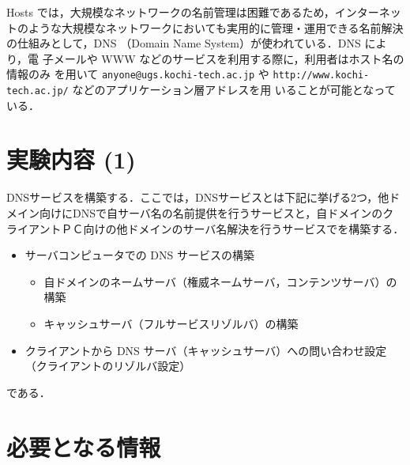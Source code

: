 Hosts では，大規模なネットワークの名前管理は困難であるため，インターネッ
トのような大規模なネットワークにおいても実用的に管理・運用できる名前解決
の仕組みとして，DNS （Domain Name System）が使われている．DNS により，電
子メールや WWW などのサービスを利用する際に，利用者はホスト名の情報のみ
を用いて \verb|anyone@ugs.kochi-tech.ac.jp| や 
\verb|http://www.kochi-tech.ac.jp/| などのアプリケーション層アドレスを用
いることが可能となっている．

\section{実験内容 (1)}

DNSサービスを構築する．ここでは，DNSサービスとは下記に挙げる2つ，他ドメイン向けにDNSで自サーバ名の名前提供を行うサービスと，自ドメインのクライアントＰＣ向けの他ドメインのサーバ名解決を行うサービスでを構築する．

\begin{itemize}
  \item サーバコンピュータでの DNS サービスの構築
	\begin{itemize}
	 \item 自ドメインのネームサーバ（権威ネームサーバ，コンテンツサーバ）の構築
	 \item キャッシュサーバ（フルサービスリゾルバ）の構築
	\end{itemize}
  \item クライアントから DNS サーバ（キャッシュサーバ）への問い合わせ設定（クライアントのリゾルバ設定）
\end{itemize}
である．

\section{必要となる情報}
